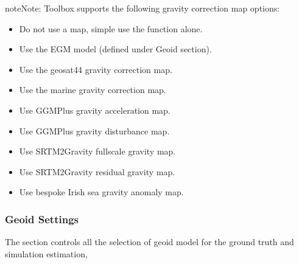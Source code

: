 \documentclass[letterpaper,10pt,english]{sphinxmanual}
\begin{document}
\begin{sphinxadmonition}{note}{Note:}
\sphinxAtStartPar
Toolbox supports the following gravity correction map options:
\begin{itemize}
\item {} 
\sphinxAtStartPar
{} \sphinxhyphen{} Do not use a map, simple use the function alone.

\item {} 
\sphinxAtStartPar
{} \sphinxhyphen{} Use the EGM model (defined under Geoid section).

\item {} 
\sphinxAtStartPar
{} \sphinxhyphen{} Use the geosat\sphinxhyphen{}44 gravity correction map.

\item {} 
\sphinxAtStartPar
{} \sphinxhyphen{} Use the marine gravity correction map.

\item {} 
\sphinxAtStartPar
{} \sphinxhyphen{} Use GGMPlus gravity acceleration map.

\item {} 
\sphinxAtStartPar
{} \sphinxhyphen{} Use GGMPlus gravity disturbance map.

\item {} 
\sphinxAtStartPar
{} \sphinxhyphen{} Use SRTM2Gravity full\sphinxhyphen{}scale gravity map.

\item {} 
\sphinxAtStartPar
{} \sphinxhyphen{} Use SRTM2Gravity residual gravity map.

\item {} 
\sphinxAtStartPar
{} \sphinxhyphen{} Use bespoke Irish sea gravity anomaly map.

\end{itemize}
\end{sphinxadmonition}


\subsubsection{Geoid Settings}
\label{\detokenize{usage/configuration:geoid-settings}}
\sphinxAtStartPar
The  section controls all the selection of geoid model for the ground truth and simulation estimation,
\end{document}

